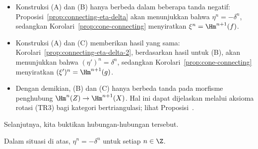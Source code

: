 \begin{itemize}
	\item Konstruksi (A) dan (B) hanya berbeda dalam beberapa tanda negatif:
	Proposisi~\ref{prop:connecting-eta-delta} akan menunjukkan bahwa
	$\eta^n=-\delta^n$, sedangkan Korolari~\ref{prop:cone-connecting}
	menyiratkan $\xi^n=\Hm^{n+1}(f)$.
	\item Konstruksi (A) dan (C) memberikan hasil yang sama:
	Korolari~\ref{prop:connecting-eta-delta-2}, berdasarkan hasil untuk (B),
	akan menunjukkan bahwa $(\eta')^n=\delta^n$, sedangkan
	Korolari~\ref{prop:cone-connecting} menyiratkan
	$(\xi')^n=\Hm^{n+1}(g)$.
	\item Dengan demikian, (B) dan (C) hanya berbeda tanda pada morfisme
	penghubung $\Hm^n(Z)\to\Hm^{n+1}(X)$. Hal ini dapat dijelaskan melalui
	aksioma rotasi (TR3) bagi kategori bertriangulasi; lihat
	Proposisi~.
\end{itemize}

Selanjutnya, kita buktikan hubungan-hubungan tersebut.

\begin{proposisi}\label{prop:connecting-eta-delta}
	Dalam situasi di atas, $\eta^n=-\delta^n$ untuk setiap $n\in\Z$.
\end{proposisi}

